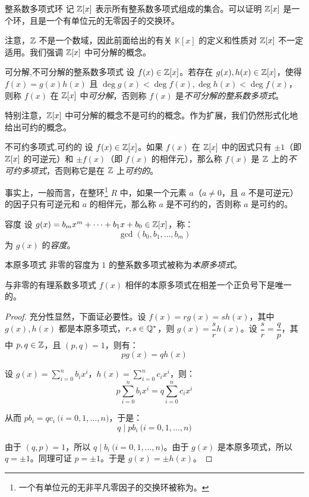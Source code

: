 \begin{definition}{整系数多项式环}
	记 $\mathbb Z[x]$ 表示所有整系数多项式组成的集合。可以证明 $\mathbb Z[x]$ 是一个环，且是一个有单位元的无零因子的交换环。
\end{definition}

注意，$\mathbb Z$ 不是一个数域，因此前面给出的有关 $\mathbb K[x]$ 的定义和性质对 $\mathbb Z[x]$ 不一定适用。我们强调 $\mathbb Z[x]$ 中可分解的概念。

\begin{definition}{可分解,不可分解的整系数多项式}
	设 $f(x) \in \mathbb Z[x]$。若存在 $g(x), h(x) \in \mathbb Z[x]$，使得 $f(x) = g(x) h(x)$ 且 $\deg g(x) < \deg f(x), \deg h(x) < \deg f(x)$，则称 $f(x)$ 在 $\mathbb Z[x]$ 中\emph{可分解}，否则称 $f(x)$ 是\emph{不可分解的整系数多项式}。
\end{definition}

特别注意，$\mathbb Z[x]$ 中可分解的概念不是可约的概念。作为扩展，我们仍然形式化地给出可约的概念。

\begin{definition}{不可约多项式,可约的}
	设 $f(x) \in \mathbb Z[x]$。如果 $f(x)$ 在 $\mathbb Z[x]$ 中的因式只有 $\pm 1$（即 $\mathbb Z[x]$ 的可逆元）和 $\pm f(x)$（即 $f(x)$ 的相伴元），那么称 $f(x)$ 是 $\mathbb Z$ 上的\emph{不可约多项式}，否则称它是在 $\mathbb Z$ 上\emph{可约的}。
\end{definition}

事实上，一般而言，在整环\footnote{一个有单位元的无非平凡零因子的交换环被称为\emph{}。} $R$ 中，如果一个元素 $a$（$a \ne 0$，且 $a$ 不是可逆元）的因子只有可逆元和 $a$ 的相伴元，那么称 $a$ 是不可约的，否则称 $a$ 是可约的。

\bigskip

\begin{definition}{容度}
	设 $g(x) = b_m x^m + \cdots + b_1 x + b_0 \in \mathbb Z[x]$，称：
	$$
	\gcd(b_0, b_1, \ldots, b_m)
	$$
	为 $g(x)$ 的\emph{容度}。
\end{definition}

\begin{definition}{本原多项式}
	非零的容度为 $1$ 的整系数多项式被称为\emph{本原多项式}。
\end{definition}

\begin{proposition}
	与非零的有理系数多项式 $f(x)$ 相伴的本原多项式在相差一个正负号下是唯一的。
\end{proposition}

\begin{proof}
	充分性显然，下面证必要性。设 $f(x) = r g(x) = s h(x)$，其中 $g(x), h(x)$ 都是本原多项式，$r, s \in \mathbb Q^*$，则 $g(x) = \dfrac{s}{r} h(x)$。设 $\dfrac{s}{r} = \dfrac{q}{p}$，其中 $p, q \in \mathbb Z$，且 $(p, q) = 1$，则有：
	$$
	p g(x) = q h(x)
	$$

	设 $g(x) = \sum\limits_{i = 0}^ n b_i x^i$，$h(x) = \sum\limits_{i = 0}^n c_i x^i$，则：
	$$
	p \sum\limits_{i = 0}^n b_i x^i = q \sum\limits_{i = 0}^n c_i x^i
	$$

	从而 $p b_i = q c_i \pod{i = 0, 1, \ldots, n}$，于是：
	$$
	q \mid p b_i \pod{i = 0, 1, \ldots, n}
	$$

	由于 $(q, p) = 1$，所以 $q \mid b_i \pod{i = 0, 1, \ldots, n}$。由于 $g(x)$ 是本原多项式，所以 $q	 = \pm 1$。同理可证 $p = \pm 1$。于是 $g(x) = \pm h(x)$。
\end{proof}

